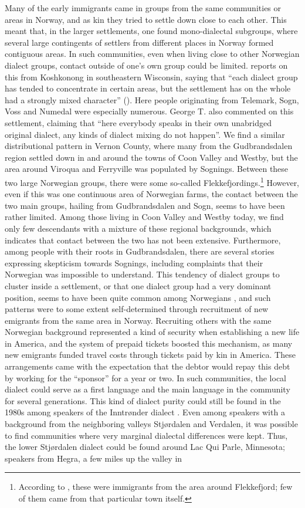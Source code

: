 \documentclass[output=paper]{langscibook}
\begin{document}
Many of the early immigrants came in groups from the same communities or areas in Norway, and as kin they tried to settle down close to each other. This meant that, in the larger settlements, one found mono-dialectal subgroups, where several large contingents of settlers from different places in Norway formed contiguous areas. In such communities, even when living close to other Norwegian dialect groups, contact outside of one’s own group could be limited. \citeauthor{Haugen1953} reports on this from Koshkonong in southeastern Wisconsin, saying that “each dialect group has tended to concentrate in certain areas, but the settlement has on the whole had a strongly mixed character” (\citeyear[607]{Haugen1953}). Here people originating from Telemark, Sogn, Voss and Numedal were especially numerous.  George T. \citet[243]{Flom1912} also commented on this settlement, claiming that “here everybody speaks in their own unabridged original dialect, any kinds of dialect mixing do not happen”. We find a similar distributional pattern in Vernon County, where many from the Gudbrandsdalen region settled down in and around the towns of Coon Valley and Westby, but the area around Viroqua and Ferryville was populated by Sognings. Between these two large Norwegian groups, there were some so-called Flekkefjordings.\footnote{According to \citet[610]{Haugen1953}, these were immigrants from the area around Flekkefjord; few of them came from that particular town itself.} However, even if this was one continuous area of Norwegian farms, the contact between the two main groups, hailing from Gudbrandsdalen and Sogn, seems to have been rather limited. Among those living in Coon Valley and Westby today, we find only few descendants with a mixture of these regional backgrounds, which indicates that contact between the two has not been extensive. Furthermore, among people with their roots in Gudbrandsdalen, there are several stories expressing skepticism towards Sognings, including complaints that their Norwegian was impossible to understand. This tendency of dialect groups to cluster inside a settlement, or that one dialect group had a very dominant position, seems to have been quite common among Norwegians \citep[242--243]{Flom1912}, and such patterns were to some extent self-determined through recruitment of new emigrants from the same area in Norway. Recruiting others with the same Norwegian background represented a kind of security when establishing a new life in America, and the system of prepaid tickets boosted this mechanism, as many new emigrants funded travel costs through tickets paid by kin in America. These arrangements came with the expectation that the debtor would repay this debt by working for the “sponsor” for a year or two. In such communities, the local dialect could serve as a first language and the main language in the community for several generations. This kind of dialect purity could still be found in the 1980s among speakers of the Inntrønder dialect \citep{Hjelde1992}. Even among speakers with a background from the neighboring valleys Stjørdalen and Verdalen, it was possible to find communities where very marginal dialectal differences were kept. Thus, the lower Stjørdalen dialect could be found around Lac Qui Parle, Minnesota; speakers from Hegra, a few miles up the valley in 
\end{document}
